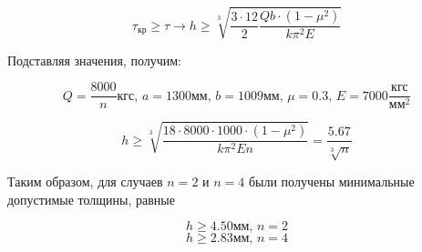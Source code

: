 \begin{equation}
\tau_\text{кр} \geq \tau \to h \geq \sqrt[3]{\frac{3\cdot12}{2}\frac{Qb\cdot(1-\mu^2)}{k\pi^2E}} 
\end{equation}

Подставляя значения, получим:

\begin{equation}
Q=\frac{8000}{n}\text{кгс},\,a=1300\text{мм},\,b=1009\text{мм},\,\mu=0.3,\,E=7000\frac{\text{кгс}}{\text{мм}^2}
\end{equation}

\begin{equation}
h \geq \sqrt[3]{\frac{18\cdot8000\cdot1000\cdot(1-\mu^2)}{k\pi^2En}} = \frac{5.67}{\sqrt[3]{n}} 
\end{equation}

Таким образом, для случаев $n = 2$ и $n = 4$  были получены минимальные допустимые толщины, 
равные

\begin{equation}
h\geq4.50\text{мм},\,n=2
\end{equation}
\begin{equation}
h\geq2.83\text{мм},\,n=4
\end{equation}
